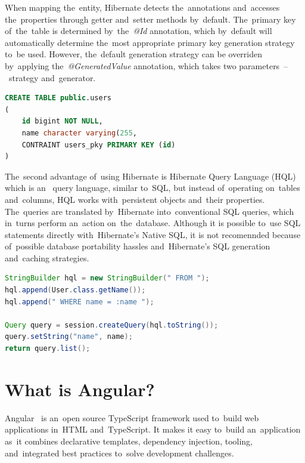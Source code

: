 When mapping the~entity, Hibernate detects the~annotations and~accesses
the~properties through getter and~setter methods by~default. The~primary key
of~the~table is determined by~the~\textit{@Id} annotation, which by~default will
automatically determine the~most appropriate primary key generation strategy
to~be used. However, the~default generation strategy can be overriden
by~applying the~\textit{@GeneratedValue} annotation, which takes two
parameters~--~strategy and~generator.

\vspace{1mm}
\begin{lstlisting}[caption=The~SQL code that is generated by~Hibernate when
mapping the~entity from~the~listing~\ref{lst-table}, style=dp-default,
language=SQL, label=lst-table-sql]
CREATE TABLE public.users
(
	id bigint NOT NULL,
	name character varying(255,
	CONTRAINT users_pky PRIMARY KEY (id)
)
\end{lstlisting}

The~second advantage of~using Hibernate is Hibernate Query Language (HQL) which
is an~ query language, similar to~SQL, but instead
of~operating on~tables and~columns, HQL works with~persistent objects and~their
properties. The~queries are translated by~Hibernate into~conventional SQL
queries, which in~turns perform an~action on~the~database. Although it is
possible to~use SQL statements directly with~Hibernate's Native SQL, it is not
recomennded because of~possible database portability hassles and~Hibernate's SQL
generation and~caching strategies.

\vspace{1mm}
\begin{lstlisting}[caption=An~example of~HQL query that selects users with~name
\uv{John Doe}., style=dp-default, language=Java, label=lst-hql] 
StringBuilder hql = new StringBuilder(" FROM ");
hql.append(User.class.getName());
hql.append(" WHERE name = :name ");

Query query = session.createQuery(hql.toString());
query.setString("name", name);
return query.list();
\end{lstlisting}



\section{What is Angular?}
Angular~\cite{Angular} is an~open source TypeScript framework used to~build web
applications in~HTML and~TypeScript. It makes it easy to~build an~application
as~it combines declarative templates, dependency injection, 
tooling, and~integrated best practices to~solve development challenges.


